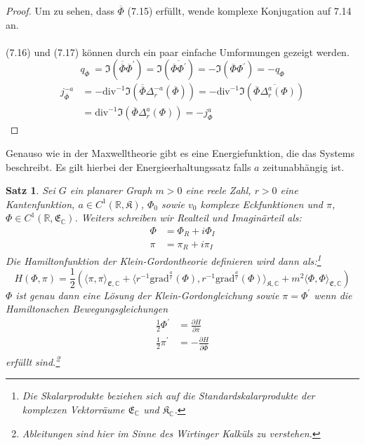 \documentclass[11pt,a4paper,leqno]{report}
\newtheorem{proposition}{Satz}[chapter]
\numberwithin{equation}{chapter}
\begin{document}
\begin{proof}
	Um zu sehen, dass $\overline{\Phi}$ (7.15) erf\"ullt, wende komplexe Konjugation auf 7.14 an.\\
	\\
	(7.16) und (7.17) k\"onnen durch ein paar einfache Umformungen gezeigt werden.
	\begin{equation*}
		q_{\overline{\Phi}}\ = \Im(\overline{\overline{\Phi}}\overline{\Phi}^\prime)
		= \Im(\overline{\overline{\Phi}\Phi^\prime}) = -\Im(\overline{\Phi}\Phi^\prime)
		= -q_\Phi
	\end{equation*}
	\begin{align*}
		j_{\overline{\Phi}}^{-a} &= -\text{div}^{-1}\Im(\overline{\overline{\Phi}}\Delta^{-a}_r(\overline{\Phi}))
		= -\text{div}^{-1}\Im(\overline{\overline{\Phi}\Delta^a_r(\Phi)})\\
		&= \text{div}^{-1}\Im(\overline{\Phi}\Delta^a_r(\Phi))= -j_{\Phi}^a
	\end{align*}
\end{proof}
\noindent
Genauso wie in der Maxwelltheorie gibt es eine Energiefunktion, die das Systems beschreibt. Es gilt hierbei der Energieerhaltungssatz falls $a$ zeitunabh\"angig ist.
\begin{proposition}
	Sei $G$ ein planarer Graph $m>0$ eine reele Zahl, $r>0$ eine Kantenfunktion, $a\in C^1(\mathbb{R}, \mathfrak{K})$, $\Phi_0$ sowie $v_0$ komplexe Eckfunktionen und $\pi$, $\Phi\in C^1(\mathbb{R}, \mathfrak{E}_\mathbb{C})$. Weiters schreiben wir Realteil und Imagin\"arteil als:
	\begin{align}
		\Phi &= \Phi_R + i\Phi_I\\
	     \pi &= \pi_R + i\pi_I
	\end{align}
	Die Hamiltonfunktion der Klein-Gordontheorie definieren wird dann als:\footnote{Die Skalarprodukte beziehen sich auf die Standardskalarprodukte der komplexen Vektorr\"aume $\mathfrak{E}_\mathbb{C}$ und $\mathfrak{K}_\mathbb{C}$.}
	\begin{equation}
	H(\Phi, \pi) = \frac{1}{2}(\langle \pi, \pi\rangle_{\mathfrak{E},\mathbb{C}}+\langle r^{-1}\text{grad}^{\frac{a}{r}}(\Phi), r^{-1}\text{grad}^{\frac{a}{r}}(\Phi)\rangle_{\mathfrak{K},\mathbb{C}}+m^2\langle \Phi,\Phi\rangle_{\mathfrak{E},\mathbb{C}})
	\end{equation}	
	 $\Phi$ ist genau dann eine L\"osung der Klein-Gordongleichung sowie $\pi=\Phi^\prime$ wenn die Hamiltonschen Bewegungsgleichungen
	\begin{align}
		\frac{1}{2}\Phi^\prime &= \frac{\partial H}{\partial \overline{\pi}}\\
		\frac{1}{2}\pi^\prime &= - \frac{\partial H}{\partial \overline{\Phi}}
	\end{align} erf\"ullt sind.\footnote{Ableitungen sind hier im Sinne des Wirtinger Kalk\"uls zu verstehen.}
\end{proposition}
\end{document}
